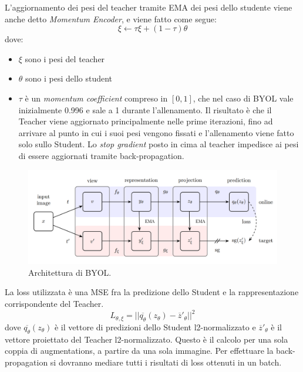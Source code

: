 L'aggiornamento dei pesi del teacher tramite EMA dei pesi dello studente viene anche detto \textit{Momentum Encoder}, e viene fatto come segue:
\begin{equation}
    \xi \gets \tau \xi + (1-\tau)\theta
\end{equation}
dove:
\begin{itemize}
    \item \(\xi\) sono i pesi del teacher
    \item \(\theta\) sono i pesi dello student
    \item \(\tau\) è un \textit{momentum coefficient} compreso in \([0, 1]\), che nel caso di BYOL vale inizialmente 0.996 e sale a 1 durante l'allenamento. Il risultato è che il Teacher viene aggiornato principalmente nelle prime iterazioni, fino ad arrivare al punto in cui i suoi pesi vengono fissati e l'allenamento viene fatto solo sullo Student. Lo \textit{stop gradient} posto in cima al teacher impedisce ai pesi di essere aggiornati tramite back-propagation.
\end{itemize}
\vspace{5mm}
\begin{figure}[!t]
    \centering
    \includegraphics[width=\textwidth]{Immagini/ssl/arch_byol.png}
    \caption{Architettura di BYOL.}
    \label{fig:arch_byol}
\end{figure}
La loss utilizzata è una MSE fra la predizione dello Student e la rappresentazione corrispondente del Teacher.
\begin{equation}
    L_{\theta, \xi} = || \overline{q_{\theta}}(z_\theta) - \overline{z}'_\theta||^2
\end{equation}
dove \(\overline{q_\theta}(z_\theta)\) è il vettore di predizioni dello Student l2-normalizzato e \(\overline{z}'_\theta\) è il vettore proiettato del Teacher l2-normalizzato. Questo è il calcolo per una sola coppia di augmentations, a partire da una sola immagine. Per effettuare la back-propagation si dovranno mediare tutti i risultati di loss ottenuti in un batch.

